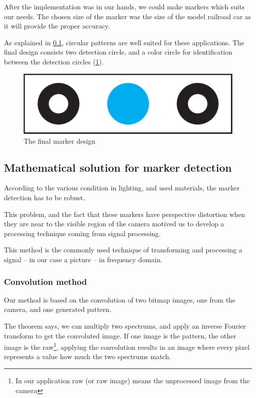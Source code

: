 After the implementation was in our hands, we could make markers which suits our needs. The chosen size of the marker was the size of the model railroad car as it will provide the proper accuracy.

As explained in \cref{fig:case_study:opencv_math}, circular patterns are well suited for these applications. The final design consists two detection circle, and a color circle for identification between the detection circles (\cref{fig:case_study:final_marker}).

\begin{figure}[h]
	\centering
	\includegraphics[width=0.5\linewidth]{include/figures/chapter_6/opencv_finalmarker}
	\caption{The final marker design}
	\label{fig:case_study:final_marker} 
\end{figure}

\subsection{Mathematical solution for marker detection}
\label{fig:case_study:opencv_math}


According to the various condition in lighting, and used materials, the marker detection has to be robust.

This problem, and the fact that these markers have perspective distortion when they are near to the visible region of the camera motived us to develop a processing technique coming from signal processing.

This method is the commonly used technique of transforming and processing a signal -- in our case a picture -- in frequency domain.

\subsubsection{Convolution method}
\label{sec:case_study:convolution}

Our method is based on the convolution of two bitmap images, one from the camera, and one generated pattern.

The theorem says, we can multiply two spectrums, and apply an inverse Fourier transform to get the convoluted image. If one image is the pattern, the other image is the raw\footnote{In our application raw (or raw image) means the unprocessed image from the camera}, applying the convolution results in an image where every pixel represents a value how much the two spectrums match.

